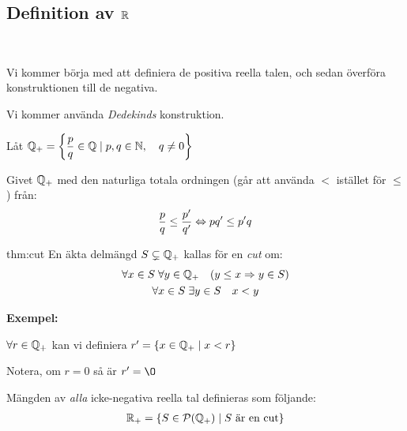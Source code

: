 \subsection{Definition av $\mathbb{R}$}\hfill\\\par
\noindent Vi kommer börja med att definiera de positiva reella talen, och sedan överföra konstruktionen till de negativa.
\par\bigskip
\noindent Vi kommer använda \textit{Dedekinds} konstruktion.
\par\bigskip
\noindent Låt $\mathbb{Q}_+ = \left\{\dfrac{p}{q}\in\mathbb{Q}\;|\;p,q\in\mathbb{N},\quad q\neq0\right\}$\par
\noindent Givet $\mathbb{Q}_+$ med den naturliga totala ordningen (går att använda $<$ istället för $\leq$) från:
\begin{equation*}
  \begin{gathered}
    \dfrac{p}{q}\leq \dfrac{p^{\prime}}{q^{\prime}}\Leftrightarrow pq^{\prime}\leq p^{\prime}q
  \end{gathered}
\end{equation*}
\par\bigskip
\begin{theo}[Cut]{thm:cut}
  En äkta delmängd $S\subsetneq \mathbb{Q}_+$ kallas för en \textit{cut} om:
  \begin{equation*}
    \begin{gathered}
      \forall x\in S\;\forall y\in \mathbb{Q}_+\quad (y\leq x\Rightarrow y\in S)\\
      \forall x\in S\;\exists y\in S\quad x<y
    \end{gathered}
  \end{equation*}
\end{theo}
\par\bigskip
\noindent\textbf{Exempel:}\par
\noindent $\forall r\in\mathbb{Q}_+$ kan vi definiera $r^{\prime} = \left\{x\in\mathbb{Q}_+\;|\; x<r\right\}$\par
\noindent Notera, om $r =0$ så är $r^{\prime}=\O$
\par\bigskip
\begin{theo}
  Mängden av \textit{alla} icke-negativa reella tal definieras som följande:
  \begin{equation*}
    \begin{gathered}
      \mathbb{R}_+ = \left\{S\in\mathcal{P}(\mathbb{Q}_+)\;|\;S\text{ är en cut}\right\}
    \end{gathered}
  \end{equation*}
\end{theo}
